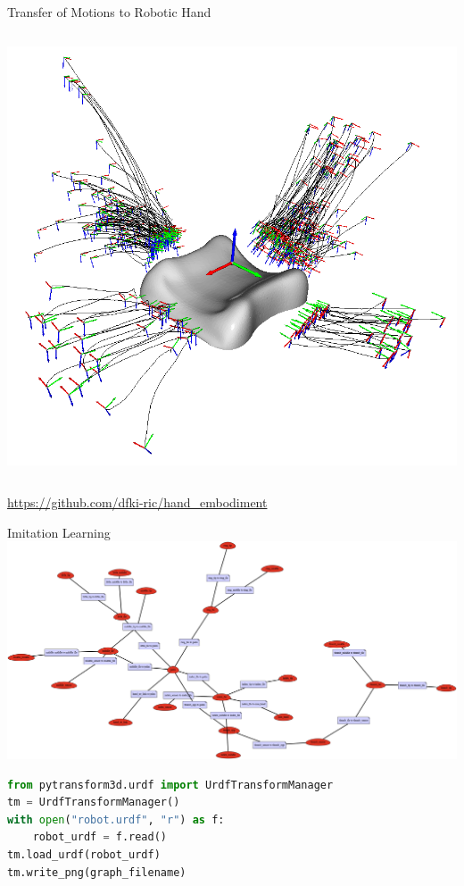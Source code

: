 \documentclass[14pt]{beamer}
\begin{document}
\begin{frame}[fragile]{Transfer of Motions to Robotic Hand}
\begin{columns}
\begin{column}{0.6\textwidth}
\includegraphics[width=\textwidth]{images/embodiment_dataset}
\end{column}
\end{columns}
{\small \url{https://github.com/dfki-ric/hand_embodiment}}
\end{frame}

\begin{frame}[fragile]{Imitation Learning}
\includegraphics[width=\textwidth]{images/embodiment_graph}
\begin{lstlisting}[language=Python]
from pytransform3d.urdf import UrdfTransformManager
tm = UrdfTransformManager()
with open("robot.urdf", "r") as f:
    robot_urdf = f.read()
tm.load_urdf(robot_urdf)
tm.write_png(graph_filename)
\end{lstlisting}
\end{frame}
\end{document}
